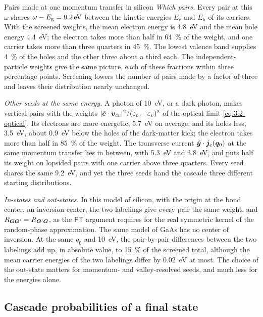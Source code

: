 \begin{workedexample}{Pairs made at one momentum transfer in silicon}
\emph{Which pairs.} Every pair at this $\omega$ shares $\omega - E_{\mathrm{g}} = \SI{9.2}{eV}$ between the kinetic energies $E_{\mathrm{e}}$ and $E_{\mathrm{h}}$ of its carriers. With the screened weights, the mean electron energy is \SI{4.8}{eV} and the mean hole energy \SI{4.4}{eV}; the electron takes more than half in \SI{64}{\percent} of the weight, and one carrier takes more than three quarters in \SI{45}{\percent}. The lowest valence band supplies \SI{4}{\percent} of the holes and the other three about a third each. The independent-particle weights give the same picture, each of these fractions within three percentage points. Screening lowers the number of pairs made by a factor of three and leaves their distribution nearly unchanged.

\emph{Other seeds at the same energy.} A photon of \SI{10}{eV}, or a dark photon, makes vertical pairs with the weights $|\hat{\bm{e}}\cdot\bm{v}_{cv}|^2/(\varepsilon_c - \varepsilon_v)^2$ of the optical limit \cref{eq:3.2-optical}. Its electrons are more energetic, \SI{5.7}{eV} on average, and its holes less, \SI{3.5}{eV}, about \SI{0.9}{eV} below the holes of the dark-matter kick; the electron takes more than half in \SI{85}{\percent} of the weight. The transverse current $\hat{\bm{y}}\cdot\bm{j}_e(\bm{q}_0)$ at the same momentum transfer lies in between, with \SI{5.3}{eV} and \SI{3.8}{eV}, and puts half its weight on lopsided pairs with one carrier above three quarters. Every seed shares the same \SI{9.2}{eV}, and yet the three seeds hand the cascade three different starting distributions.

\emph{In-states and out-states.} In this model of silicon, with the origin at the bond center, an inversion center, the two labelings give every pair the same weight, and $R_{\bm{G}\bm{G}'} = R_{\bm{G}'\bm{G}}$, as the $\mathsf{P}\mathsf{T}$ argument requires for the real symmetric kernel of the random-phase approximation. The same model of GaAs has no center of inversion. At the same $q_0$ and \SI{10}{eV}, the pair-by-pair differences between the two labelings add up, in absolute value, to \SI{15}{\percent} of the screened total, although the mean carrier energies of the two labelings differ by \SI{0.02}{eV} at most. The choice of the out-state matters for momentum- and valley-resolved seeds, and much less for the energies alone.
\end{workedexample}

\subsection{Cascade probabilities of a final state}\label{sec:8.7-handoff}

